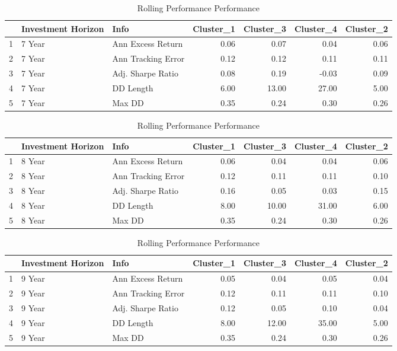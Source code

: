 \documentclass[11pt,preprint, authoryear]{elsarticle}
\numberwithin{equation}{section}
\numberwithin{figure}{section}
\numberwithin{table}{section}
\begin{document}
\begin{longtable}{rllrrrr}
\caption{Rolling Performance Performance \label{tab12}} \\ 
  \hline
 & Investment Horizon & Info & Cluster\_1 & Cluster\_3 & Cluster\_4 & Cluster\_2 \\ 
  \hline
1 & 7 Year & Ann Excess Return & 0.06 & 0.07 & 0.04 & 0.06 \\ 
  2 & 7 Year & Ann Tracking Error & 0.12 & 0.12 & 0.11 & 0.11 \\ 
  3 & 7 Year & Adj. Sharpe Ratio & 0.08 & 0.19 & -0.03 & 0.09 \\ 
  4 & 7 Year & DD Length & 6.00 & 13.00 & 27.00 & 5.00 \\ 
  5 & 7 Year & Max DD & 0.35 & 0.24 & 0.30 & 0.26 \\ 
   \hline
\hline
\end{longtable}

\begin{longtable}{rllrrrr}
\caption{Rolling Performance Performance \label{tab13}} \\ 
  \hline
 & Investment Horizon & Info & Cluster\_1 & Cluster\_3 & Cluster\_4 & Cluster\_2 \\ 
  \hline
1 & 8 Year & Ann Excess Return & 0.06 & 0.04 & 0.04 & 0.06 \\ 
  2 & 8 Year & Ann Tracking Error & 0.12 & 0.11 & 0.11 & 0.10 \\ 
  3 & 8 Year & Adj. Sharpe Ratio & 0.16 & 0.05 & 0.03 & 0.15 \\ 
  4 & 8 Year & DD Length & 8.00 & 10.00 & 31.00 & 6.00 \\ 
  5 & 8 Year & Max DD & 0.35 & 0.24 & 0.30 & 0.26 \\ 
   \hline
\hline
\end{longtable}

\begin{longtable}{rllrrrr}
\caption{Rolling Performance Performance \label{tab14}} \\ 
  \hline
 & Investment Horizon & Info & Cluster\_1 & Cluster\_3 & Cluster\_4 & Cluster\_2 \\ 
  \hline
1 & 9 Year & Ann Excess Return & 0.05 & 0.04 & 0.05 & 0.04 \\ 
  2 & 9 Year & Ann Tracking Error & 0.12 & 0.11 & 0.11 & 0.10 \\ 
  3 & 9 Year & Adj. Sharpe Ratio & 0.12 & 0.05 & 0.10 & 0.04 \\ 
  4 & 9 Year & DD Length & 8.00 & 12.00 & 35.00 & 5.00 \\ 
  5 & 9 Year & Max DD & 0.35 & 0.24 & 0.30 & 0.26 \\ 
   \hline
\hline
\end{longtable}
\end{document}
